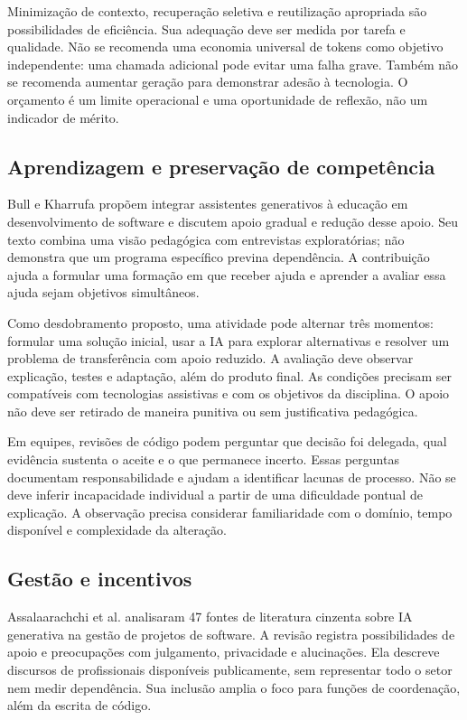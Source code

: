 \documentclass[11pt,a4paper]{article}
\begin{document}
Minimização de contexto, recuperação seletiva e reutilização apropriada são possibilidades de eficiência. Sua adequação deve ser medida por tarefa e qualidade. Não se recomenda uma economia universal de tokens como objetivo independente: uma chamada adicional pode evitar uma falha grave. Também não se recomenda aumentar geração para demonstrar adesão à tecnologia. O orçamento é um limite operacional e uma oportunidade de reflexão, não um indicador de mérito.

\subsection{Aprendizagem e preservação de competência}
Bull e Kharrufa \cite{educacao} propõem integrar assistentes generativos à educação em desenvolvimento de software e discutem apoio gradual e redução desse apoio. Seu texto combina uma visão pedagógica com entrevistas exploratórias; não demonstra que um programa específico previna dependência. A contribuição ajuda a formular uma formação em que receber ajuda e aprender a avaliar essa ajuda sejam objetivos simultâneos.

Como desdobramento proposto, uma atividade pode alternar três momentos: formular uma solução inicial, usar a IA para explorar alternativas e resolver um problema de transferência com apoio reduzido. A avaliação deve observar explicação, testes e adaptação, além do produto final. As condições precisam ser compatíveis com tecnologias assistivas e com os objetivos da disciplina. O apoio não deve ser retirado de maneira punitiva ou sem justificativa pedagógica.

Em equipes, revisões de código podem perguntar que decisão foi delegada, qual evidência sustenta o aceite e o que permanece incerto. Essas perguntas documentam responsabilidade e ajudam a identificar lacunas de processo. Não se deve inferir incapacidade individual a partir de uma dificuldade pontual de explicação. A observação precisa considerar familiaridade com o domínio, tempo disponível e complexidade da alteração.

\subsection{Gestão e incentivos}
Assalaarachchi et al. \cite{gestao} analisaram 47 fontes de literatura cinzenta sobre IA generativa na gestão de projetos de software. A revisão registra possibilidades de apoio e preocupações com julgamento, privacidade e alucinações. Ela descreve discursos de profissionais disponíveis publicamente, sem representar todo o setor nem medir dependência. Sua inclusão amplia o foco para funções de coordenação, além da escrita de código.
\end{document}
